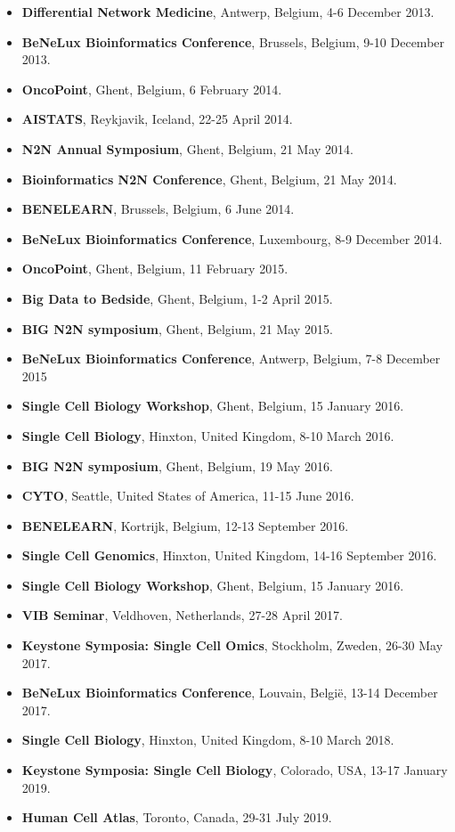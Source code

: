 \begin{itemize}
  \item \textbf{Differential Network Medicine}, Antwerp, Belgium, 4-6 December 2013.
  \item \textbf{BeNeLux Bioinformatics Conference}, Brussels, Belgium, 9-10 December 2013.
  \item \textbf{OncoPoint}, Ghent, Belgium, 6 February 2014.
  \item \textbf{AISTATS}, Reykjavik, Iceland, 22-25 April 2014.
  \item \textbf{N2N Annual Symposium}, Ghent, Belgium, 21 May 2014.
  \item \textbf{Bioinformatics N2N Conference}, Ghent, Belgium, 21 May 2014.
  \item \textbf{BENELEARN}, Brussels, Belgium, 6 June 2014.
  \item \textbf{BeNeLux Bioinformatics Conference}, Luxembourg, 8-9 December 2014.
  \item \textbf{OncoPoint}, Ghent, Belgium, 11 February 2015.
  \item \textbf{Big Data to Bedside}, Ghent, Belgium, 1-2 April 2015.
  \item \textbf{BIG N2N symposium}, Ghent, Belgium, 21 May 2015.
  \item \textbf{BeNeLux Bioinformatics Conference}, Antwerp, Belgium, 7-8 December 2015
  \item \textbf{Single Cell Biology Workshop}, Ghent, Belgium, 15 January 2016.
  \item \textbf{Single Cell Biology}, Hinxton, United Kingdom, 8-10 March 2016.
  \item \textbf{BIG N2N symposium}, Ghent, Belgium, 19 May 2016.
  \item \textbf{CYTO}, Seattle, United States of America, 11-15 June 2016.
  \item \textbf{BENELEARN}, Kortrijk, Belgium, 12-13 September 2016.
  \item \textbf{Single Cell Genomics}, Hinxton, United Kingdom, 14-16 September 2016.
  \item \textbf{Single Cell Biology Workshop}, Ghent, Belgium, 15 January 2016.
  \item \textbf{VIB Seminar}, Veldhoven, Netherlands, 27-28 April 2017.
  \item \textbf{Keystone Symposia: Single Cell Omics}, Stockholm, Zweden, 26-30 May 2017. 
  \item \textbf{BeNeLux Bioinformatics Conference}, Louvain, België, 13-14 December 2017.
  \item \textbf{Single Cell Biology}, Hinxton, United Kingdom, 8-10 March 2018.
  \item \textbf{Keystone Symposia: Single Cell Biology}, Colorado, USA, 13-17 January 2019.
  \item \textbf{Human Cell Atlas}, Toronto, Canada, 29-31 July 2019.
\end{itemize}

